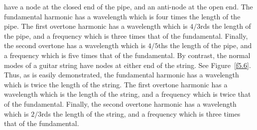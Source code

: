 have a node at the closed end of the pipe, and an anti-node at the open end. The
fundamental harmonic has a wavelength which is four times the length of the pipe. 
The first overtone harmonic has a wavelength which is $4/3$rds the length of the pipe, and a frequency which is three times that of the fundamental. Finally, the second overtone
has a wavelength which is $4/5$ths the length of the pipe, and a frequency
which is five times that of the fundamental. By contrast, the normal modes
of a guitar string have nodes at either end of the string. See Figure~\ref{f5.6}. 
Thus, as is easily demonstrated, the fundamental harmonic has a wavelength which
is twice the length of the string. The first overtone harmonic has a wavelength which
is the length of the string, and a frequency which is twice that of the fundamental. Finally, the second overtone harmonic has a wavelength which is $2/3$rds the length of the
string, and a frequency which is three times that of the fundamental.


